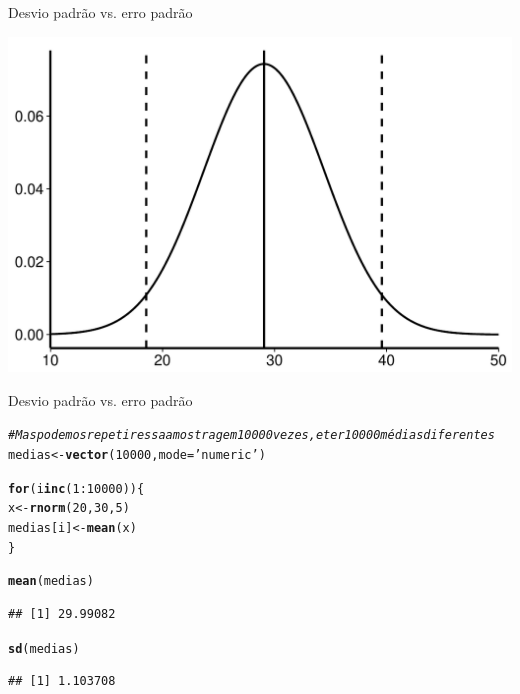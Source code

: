 \documentclass{beamer}\usepackage[]{graphicx}\usepackage[]{color}
\makeatletter
\def\maxwidth{ %
  \ifdim\Gin@nat@width>\linewidth
    \linewidth
  \else
    \Gin@nat@width
  \fi
}
\newcommand{\hlnum}[1]{\textcolor[rgb]{0.686,0.059,0.569}{#1}}%
\newcommand{\hlstr}[1]{\textcolor[rgb]{0.192,0.494,0.8}{#1}}%
\newcommand{\hlcom}[1]{\textcolor[rgb]{0.678,0.584,0.686}{\textit{#1}}}%
\newcommand{\hlopt}[1]{\textcolor[rgb]{0,0,0}{#1}}%
\newcommand{\hlstd}[1]{\textcolor[rgb]{0.345,0.345,0.345}{#1}}%
\newcommand{\hlkwa}[1]{\textcolor[rgb]{0.161,0.373,0.58}{\textbf{#1}}}%
\newcommand{\hlkwb}[1]{\textcolor[rgb]{0.69,0.353,0.396}{#1}}%
\newcommand{\hlkwc}[1]{\textcolor[rgb]{0.333,0.667,0.333}{#1}}%
\newcommand{\hlkwd}[1]{\textcolor[rgb]{0.737,0.353,0.396}{\textbf{#1}}}%
\newenvironment{kframe}{%
 \def\at@end@of@kframe{}%
 \ifinner\ifhmode%
  \def\at@end@of@kframe{\end{minipage}}%
  \begin{minipage}{\columnwidth}%
 \fi\fi%
 \def\FrameCommand##1{\hskip\@totalleftmargin \hskip-\fboxsep
 \colorbox{shadecolor}{##1}\hskip-\fboxsep
     \hskip-\linewidth \hskip-\@totalleftmargin \hskip\columnwidth}%
 \MakeFramed {\advance\hsize-\width
   \@totalleftmargin\z@ \linewidth\hsize
   \@setminipage}}%
 {\par\unskip\endMakeFramed%
 \at@end@of@kframe}
\newenvironment{knitrout}{}{} %
\renewenvironment{knitrout}{\setlength{\topsep}{0mm}}{}
\makeatother
\begin{document}
\begin{frame}[fragile]{Desvio padrão vs. erro padrão}

\begin{knitrout}
\color{fgcolor}
\includegraphics[width=\maxwidth,height=0.7\textheight]{figure/desv_err_plot1-1} 

\end{knitrout}

\end{frame} 

\begin{frame}[fragile]{Desvio padrão vs. erro padrão}


\begin{knitrout}\tiny
{}\color{fgcolor}\begin{kframe}
\begin{alltt}
\hlcom{# Mas podemos repetir essa amostragem 10000 vezes, e ter 10000 médias diferentes}
\hlstd{medias} \hlkwb{<-} \hlkwd{vector}\hlstd{(}\hlnum{10000}\hlstd{,}\hlkwc{mode}\hlstd{=}\hlstr{'numeric'}\hlstd{)}

\hlkwa{for} \hlstd{(i} \hlkwa{in} \hlkwd{c}\hlstd{(}\hlnum{1}\hlopt{:}\hlnum{10000}\hlstd{))\{}
  \hlstd{x} \hlkwb{<-} \hlkwd{rnorm}\hlstd{(}\hlnum{20}\hlstd{,}\hlnum{30}\hlstd{,}\hlnum{5}\hlstd{)}
  \hlstd{medias[i]} \hlkwb{<-} \hlkwd{mean}\hlstd{(x)}
\hlstd{\}}

\hlkwd{mean}\hlstd{(medias)}
\end{alltt}
\begin{verbatim}
## [1] 29.99082
\end{verbatim}
\begin{alltt}
\hlkwd{sd}\hlstd{(medias)}
\end{alltt}
\begin{verbatim}
## [1] 1.103708
\end{verbatim}
\end{kframe}
\end{knitrout}

\end{frame} 
\end{document}
